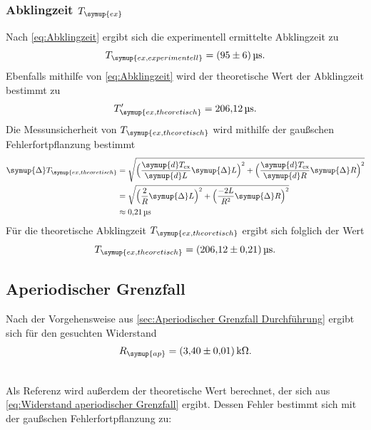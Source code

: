 \subsubsection{Abklingzeit $T_{\symup{ex}}$}
Nach \ref{eq:Abklingzeit} ergibt sich die experimentell ermittelte Abklingzeit zu
\begin{equation*}
  T_{\symup{ex, experimentell}} = \qty{95+-6}{\micro\second}.
\end{equation*}
Ebenfalls mithilfe von \ref{eq:Abklingzeit} wird der theoretische Wert der Abklingzeit bestimmt zu
\begin{equation*}
  T'_{\symup{ex, theoretisch}} = \qty{206.12}{\micro\second}.
\end{equation*}
Die Messunsicherheit von $T_{\symup{ex, theoretisch}}$ wird mithilfe der gaußschen Fehlerfortpflanzung bestimmt
\begin{align*}
  \symup{\Delta}T_{\symup{ex, theoretisch}} &= \sqrt{\Bigl(\frac{\symup{d}T_{\text{ex}}}{\symup{d}L}\symup{\Delta} L \Bigr)^2+
  \Bigl(\frac{\symup{d}T_{\text{ex}}}{\symup{d}R}\symup{\Delta} R\Bigr)^2} \\
  &=\sqrt{\Bigl(\frac{2}{R}\symup{\Delta} L\Bigr)^2+\Bigl(\frac{-2L}{R^2}\symup{\Delta}R\Bigr)^2} \\
  &\approx \qty{0.21}{\micro\second}
\end{align*}
Für die theoretische Abklingzeit $T_{\symup{ex, theoretisch}}$ ergibt sich folglich der Wert
\begin{equation*}
  T_{\symup{ex, theoretisch}} = \qty{206.12+-0.21}{\micro\second}.
\end{equation*}

\subsection{Aperiodischer Grenzfall}
\label{sec:Aperiodischer Grenzfall}

Nach der Vorgehensweise aus \ref{sec:Aperiodischer Grenzfall Durchführung} ergibt sich für den gesuchten Widerstand \\
\begin{gather*}
  R_{\symup{ap}} = \qty{3,40+-0.01}{\kilo\ohm}. \\ \notag
\end{gather*}

Als Referenz wird außerdem der theoretische Wert berechnet, der sich aus \eqref{eq:Widerstand aperiodischer Grenzfall} ergibt.
Dessen Fehler bestimmt sich mit der gaußschen Fehlerfortpflanzung zu:

